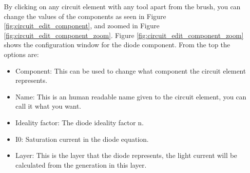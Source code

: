 By clicking on any circuit element with any tool apart from the brush, you can change the values of the components as seen in Figure \ref{fig:circuit_edit_component}, and zoomed in Figure \ref{fig:circuit_edit_component_zoom}. Figure \ref{fig:circuit_edit_component_zoom} shows the configuration window for the diode component.  From the top the options are:

\begin{itemize}
	\vspace{-0.2cm}\item Component: This can be used to change what component the circuit element represents.
	\vspace{-0.2cm}\item Name: This is an human readable name given to the circuit element, you can call it what you want.
	\vspace{-0.2cm}\item Ideality factor: The diode ideality factor n.
	\vspace{-0.2cm}\item I0: Saturation current in the diode equation.
	\vspace{-0.2cm}\item Layer: This is the layer that the diode represents, the light current will be calculated from the generation in this layer.

\end{itemize}

